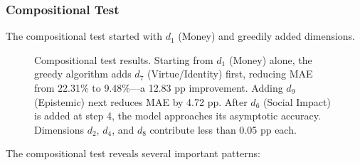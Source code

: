 \documentclass[12pt]{article}
\begin{document}
\subsubsection{Compositional Test}

The compositional test started with $d_1$ (Money) and greedily added dimensions.

\begin{figure}[H]
\centering
{}
\caption{Compositional test results.  Starting from $d_1$ (Money) alone, the greedy algorithm adds $d_7$ (Virtue/Identity) first, reducing MAE from 22.31\% to 9.48\%---a 12.83 pp improvement.  Adding $d_9$ (Epistemic) next reduces MAE by 4.72 pp.  After $d_6$ (Social Impact) is added at step 4, the model approaches its asymptotic accuracy.  Dimensions $d_2$, $d_4$, and $d_8$ contribute less than 0.05 pp each.}
\label{fig:compositional}
\end{figure}

The compositional test reveals several important patterns:
\end{document}
